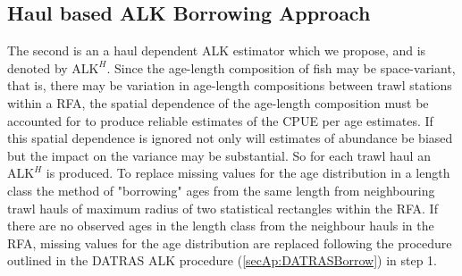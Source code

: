 \documentclass[a4paper 12pt]{article}
\numberwithin{equation}{section}
\begin{document}
\subsection{\normalsize Haul based ALK Borrowing Approach}
\label{secAp:oursBorrow}
\indent  The second is an a haul dependent ALK estimator which we propose, and is denoted by $\mathrm{ALK}^{H}$. Since the age-length composition of fish may be space-variant, that is, there may be variation in age-length compositions between trawl stations within a RFA, the spatial dependence of the age-length composition must be accounted for to produce reliable estimates of the CPUE per age estimates. If this spatial dependence is ignored not only will estimates of abundance be biased but the impact on the variance may be substantial. So for each trawl haul an $\mathrm{ALK}^{H}$ is produced. To replace missing values for the age distribution in a length class the method of "borrowing" ages from the same length  from neighbouring trawl hauls of maximum radius of two statistical rectangles within the RFA. If there are no observed ages in the length class from the neighbour hauls in the RFA, missing values for the age distribution are replaced following the procedure outlined in the DATRAS ALK procedure (\ref{secAp:DATRASBorrow}) in step 1. 


\end{document}
